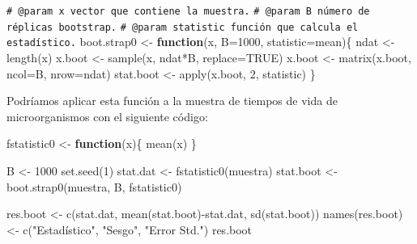 \documentclass[
]{book}
\newenvironment{Shaded}{\begin{snugshade}}{\end{snugshade}}
\newcommand{\AttributeTok}[1]{\textcolor[rgb]{0.77,0.63,0.00}{#1}}
\newcommand{\CommentTok}[1]{\textcolor[rgb]{0.56,0.35,0.01}{\textit{#1}}}
\newcommand{\ConstantTok}[1]{\textcolor[rgb]{0.00,0.00,0.00}{#1}}
\newcommand{\ControlFlowTok}[1]{\textcolor[rgb]{0.13,0.29,0.53}{\textbf{#1}}}
\newcommand{\DecValTok}[1]{\textcolor[rgb]{0.00,0.00,0.81}{#1}}
\newcommand{\FunctionTok}[1]{\textcolor[rgb]{0.00,0.00,0.00}{#1}}
\newcommand{\NormalTok}[1]{#1}
\newcommand{\OtherTok}[1]{\textcolor[rgb]{0.56,0.35,0.01}{#1}}
\newcommand{\SpecialCharTok}[1]{\textcolor[rgb]{0.00,0.00,0.00}{#1}}
\newcommand{\StringTok}[1]{\textcolor[rgb]{0.31,0.60,0.02}{#1}}
\theoremstyle{break}
\theoremstyle{nonumberplain}
\renewcommand{\CommentTok}[1]{\textcolor[rgb]{0.41,0.41,0.41}{\texttt{#1}}}
\begin{document}
\begin{Shaded}
\begin{Highlighting}[]
\CommentTok{\#\textquotesingle{} @param x vector que contiene la muestra.}
\CommentTok{\#\textquotesingle{} @param B número de réplicas bootstrap.}
\CommentTok{\#\textquotesingle{} @param statistic función que calcula el estadístico.}
\NormalTok{boot.strap0 }\OtherTok{\textless{}{-}} \ControlFlowTok{function}\NormalTok{(x, }\AttributeTok{B=}\DecValTok{1000}\NormalTok{, }\AttributeTok{statistic=}\NormalTok{mean)\{}
\NormalTok{  ndat }\OtherTok{\textless{}{-}} \FunctionTok{length}\NormalTok{(x)}
\NormalTok{  x.boot }\OtherTok{\textless{}{-}} \FunctionTok{sample}\NormalTok{(x, ndat}\SpecialCharTok{*}\NormalTok{B, }\AttributeTok{replace=}\ConstantTok{TRUE}\NormalTok{)}
\NormalTok{  x.boot }\OtherTok{\textless{}{-}} \FunctionTok{matrix}\NormalTok{(x.boot, }\AttributeTok{ncol=}\NormalTok{B, }\AttributeTok{nrow=}\NormalTok{ndat)}
\NormalTok{  stat.boot }\OtherTok{\textless{}{-}} \FunctionTok{apply}\NormalTok{(x.boot, }\DecValTok{2}\NormalTok{, statistic)}
\NormalTok{\}}
\end{Highlighting}
\end{Shaded}

Podríamos aplicar esta función a la muestra de tiempos de vida de
microorganismos con el siguiente código:

\begin{Shaded}
\begin{Highlighting}[]
\NormalTok{fstatistic0 }\OtherTok{\textless{}{-}} \ControlFlowTok{function}\NormalTok{(x)\{}
  \FunctionTok{mean}\NormalTok{(x)}
\NormalTok{\}}

\NormalTok{B }\OtherTok{\textless{}{-}} \DecValTok{1000}
\FunctionTok{set.seed}\NormalTok{(}\DecValTok{1}\NormalTok{)}
\NormalTok{stat.dat }\OtherTok{\textless{}{-}} \FunctionTok{fstatistic0}\NormalTok{(muestra)}
\NormalTok{stat.boot }\OtherTok{\textless{}{-}} \FunctionTok{boot.strap0}\NormalTok{(muestra, B, fstatistic0)}

\NormalTok{res.boot }\OtherTok{\textless{}{-}} \FunctionTok{c}\NormalTok{(stat.dat, }\FunctionTok{mean}\NormalTok{(stat.boot)}\SpecialCharTok{{-}}\NormalTok{stat.dat, }\FunctionTok{sd}\NormalTok{(stat.boot))}
\FunctionTok{names}\NormalTok{(res.boot) }\OtherTok{\textless{}{-}} \FunctionTok{c}\NormalTok{(}\StringTok{"Estadístico"}\NormalTok{, }\StringTok{"Sesgo"}\NormalTok{, }\StringTok{"Error Std."}\NormalTok{)}
\NormalTok{res.boot}
\end{Highlighting}
\end{Shaded}
\end{document}
